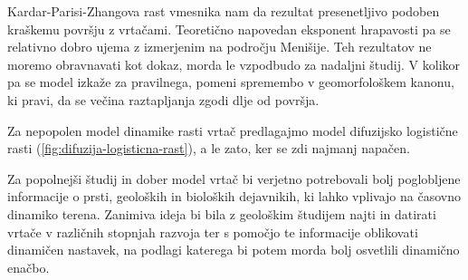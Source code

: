 \documentclass[a4paper, oneside, 12pt]{book}
\begin{document}
Kardar-Parisi-Zhangova rast vmesnika nam da rezultat presenetljivo podoben kraškemu površju z vrtačami. Teoretično napovedan eksponent hrapavosti pa se relativno dobro ujema z izmerjenim na področju Menišije. Teh rezultatov ne moremo obravnavati kot dokaz, morda le vzpodbudo za nadaljni študij. V kolikor pa se model izkaže za pravilnega, pomeni spremembo v geomorfološkem kanonu, ki pravi, da se večina raztapljanja zgodi dlje od površja.

Za nepopolen model dinamike rasti vrtač predlagajmo model difuzijsko logistične rasti (\ref{fig:difuzija-logisticna-rast}), a le zato, ker se zdi najmanj napačen.

Za popolnejši študij in dober model vrtač bi verjetno potrebovali bolj poglobljene informacije o prsti, geoloških in bioloških dejavnikih, ki lahko vplivajo na časovno dinamiko terena. Zanimiva ideja bi bila z geološkim študijem najti in datirati vrtače v različnih stopnjah razvoja ter s pomočjo te informacije oblikovati dinamičen nastavek, na podlagi katerega bi potem morda bolj osvetlili dinamično enačbo.

            \nocite{*}
            \newpage
            {}
            


            
\end{document}
